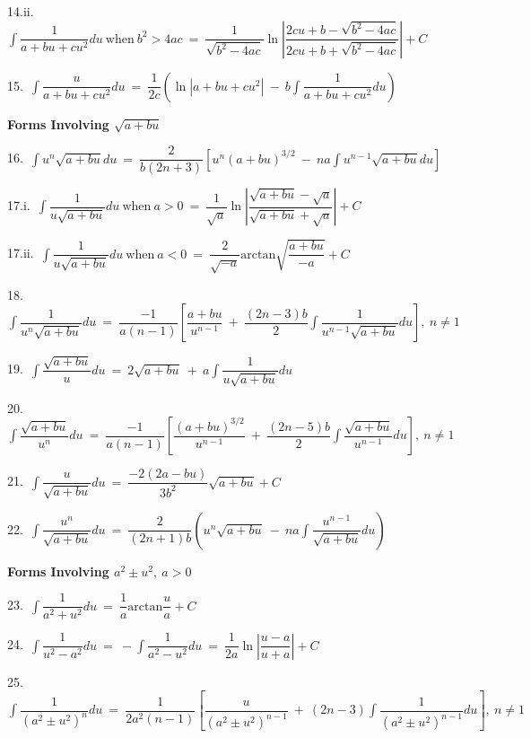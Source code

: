\documentclass{article}
\begin{document}
\begin{large}
\begin{small}
14.ii.\ $\displaystyle\int \dfrac{1}{a+bu+cu^{2}}du\ \text{when}\ b^{2}>4ac\ =\ \dfrac{1}{\sqrt{b^{2}-4ac}}\ln\left|\dfrac{2cu+b-\sqrt{b^{2}-4ac}}{2cu+b+\sqrt{b^{2}-4ac}}\right| + C$

15.\ $\displaystyle\int \dfrac{u}{a+bu+cu^{2}}du\ =\ \dfrac{1}{2c}\left(\ln|a+bu+cu^{2}|\ -\ b\displaystyle\int \dfrac{1}{a+bu+cu^{2}}du\right)$

\textbf{Forms Involving $\sqrt{a+bu}$}

16.\ $\displaystyle\int u^{n}\sqrt{a+bu}du\ =\ \dfrac{2}{b(2n+3)}\left[u^{n}(a+bu)^{3/2}\ -\ na\displaystyle\int u^{n-1}\sqrt{a+bu}du\right]$

17.i.\ $\displaystyle\int \dfrac{1}{u\sqrt{a+bu}}du\ \text{when}\ a>0\ =\ \dfrac{1}{\sqrt{a}}\ln\left|\dfrac{\sqrt{a+bu}-\sqrt{a}}{\sqrt{a+bu}+\sqrt{a}}\right| + C$

17.ii.\ $\displaystyle\int \dfrac{1}{u\sqrt{a+bu}}du\ \text{when}\ a<0\ =\ \dfrac{2}{\sqrt{-a}}\text{arctan}\sqrt{\dfrac{a+bu}{-a}} + C$

18.\ $\displaystyle\int \dfrac{1}{u^{n}\sqrt{a+bu}}du\ =\ \dfrac{-1}{a(n-1)}\left[\dfrac{a+bu}{u^{n-1}}\ +\ \dfrac{(2n-3)b}{2}\displaystyle\int \dfrac{1}{u^{n-1}\sqrt{a+bu}}du\right],\ n\neq 1$

19.\ $\displaystyle\int \dfrac{\sqrt{a+bu}}{u}du\ =\ 2\sqrt{a+bu}\ +\ a\displaystyle\int \dfrac{1}{u\sqrt{a+bu}}du$

20.\ $\displaystyle\int \dfrac{\sqrt{a+bu}}{u^{n}}du\ =\ \dfrac{-1}{a(n-1)}\left[\dfrac{(a+bu)^{3/2}}{u^{n-1}}\ +\ \dfrac{(2n-5)b}{2}\displaystyle\int \dfrac{\sqrt{a+bu}}{u^{n-1}}du\right],\ n\neq 1$

21.\ $\displaystyle\int \dfrac{u}{\sqrt{a+bu}}du\ =\ \dfrac{-2(2a-bu)}{3b^{2}}\sqrt{a+bu} + C$

22.\ $\displaystyle\int \dfrac{u^{n}}{\sqrt{a+bu}}du\ =\ \dfrac{2}{(2n+1)b}\left(u^{n}\sqrt{a+bu}\ -\ na\displaystyle\int \dfrac{u^{n-1}}{\sqrt{a+bu}}du\right)$

\textbf{Forms Involving $a^{2}\pm u^{2},\ a>0$}

23.\ $\displaystyle\int \dfrac{1}{a^{2}+u^{2}}du\ =\ \dfrac{1}{a}\text{arctan}\dfrac{u}{a} + C$

24.\ $\displaystyle\int \dfrac{1}{u^{2}-a^{2}}du\ =\ -\displaystyle\int \dfrac{1}{a^{2}-u^{2}}du\ =\ \dfrac{1}{2a}\ln\left|\dfrac{u-a}{u+a}\right| + C$

25.\ $\displaystyle\int \dfrac{1}{(a^{2}\pm u^{2})^{n}}du\ =\ \dfrac{1}{2a^{2}(n-1)}\left[\dfrac{u}{(a^{2}\pm u^{2})^{n-1}}\ +\ (2n-3)\displaystyle\int \dfrac{1}{(a^{2}\pm u^{2})^{n-1}}du\right],\ n\neq 1$


\end{small}
\end{large}
\end{document}
